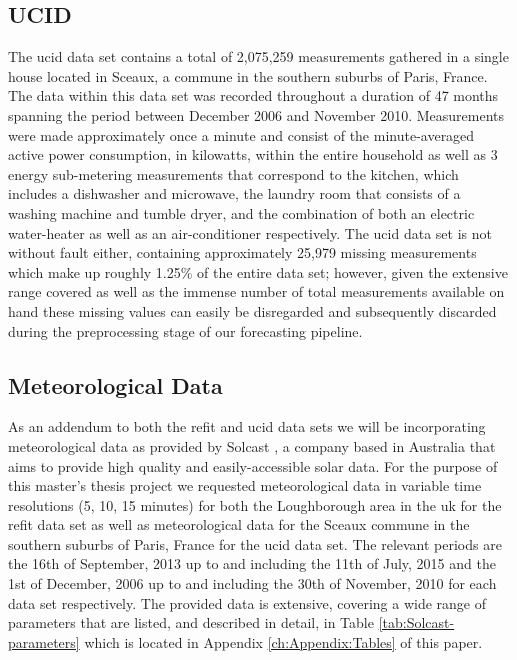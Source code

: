 \subsection{UCID}
\label{subsec:Introduction:Introduction-to-the-Data:UCID}
The \gls{ucid} data set \cite{UCID} contains a total of 2,075,259 measurements gathered in a single house located in Sceaux, a commune in the southern suburbs of Paris, France. The data within this data set was recorded throughout a duration of 47 months spanning the period between December 2006 and November 2010. Measurements were made approximately once a minute and consist of the minute-averaged active power consumption, in kilowatts, within the entire household as well as 3 energy sub-metering measurements that correspond to the kitchen, which includes a dishwasher and microwave, the laundry room that consists of a washing machine and tumble dryer, and the combination of both an electric water-heater as well as an air-conditioner respectively. The \gls{ucid} data set is not without fault either, containing approximately 25,979 missing measurements which make up roughly 1.25\% of the entire data set; however, given the extensive range covered as well as the immense number of total measurements available on hand these missing values can easily be disregarded and subsequently discarded during the preprocessing stage of our forecasting pipeline.

\subsection{Meteorological Data}
\label{subsec:Introduction:Introduction-to-the-Data:Meteorological-Data}
As an addendum to both the \gls{refit} and \gls{ucid} data sets we will be incorporating meteorological data as provided by Solcast \cite{Solcast}, a company based in Australia that aims to provide high quality and easily-accessible solar data. For the purpose of this master's thesis project we requested meteorological data in variable time resolutions (5, 10, 15 minutes) for both the Loughborough area in the \gls{uk} for the \gls{refit} data set as well as meteorological data for the Sceaux commune in the southern suburbs of Paris, France for the \gls{ucid} data set. The relevant periods are the 16th of September, 2013 up to and including the 11th of July, 2015 and the 1st of December, 2006 up to and including the 30th of November, 2010 for each data set respectively. The provided data is extensive, covering a wide range of parameters that are listed, and described in detail, in Table \ref{tab:Solcast-parameters} which is located in Appendix \ref{ch:Appendix:Tables} of this paper.

